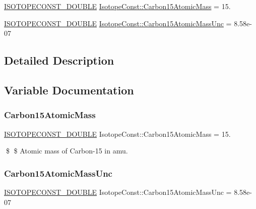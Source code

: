 \begin{DoxyCompactItemize}
\item 
\mbox{\hyperlink{group___isotope_const-_macros_ga8f45a7272ce02c0b4c65c44636ed719a}{I\+S\+O\+T\+O\+P\+E\+C\+O\+N\+S\+T\+\_\+\+D\+O\+U\+B\+LE}} \mbox{\hyperlink{group___isotope_const-_carbon-_c15_ga125cc61122384ad06638cca660519e6d}{Isotope\+Const\+::\+Carbon15\+Atomic\+Mass}} = 15.
\item 
\mbox{\hyperlink{group___isotope_const-_macros_ga8f45a7272ce02c0b4c65c44636ed719a}{I\+S\+O\+T\+O\+P\+E\+C\+O\+N\+S\+T\+\_\+\+D\+O\+U\+B\+LE}} \mbox{\hyperlink{group___isotope_const-_carbon-_c15_gaf3f3a7992c89c1f3d3882d9b927b8e33}{Isotope\+Const\+::\+Carbon15\+Atomic\+Mass\+Unc}} = 8.\+58e-\/07
\end{DoxyCompactItemize}


\subsection{Detailed Description}


\subsection{Variable Documentation}
\mbox{\label{group___isotope_const-_carbon-_c15_ga125cc61122384ad06638cca660519e6d}} 
\subsubsection{\texorpdfstring{Carbon15\+Atomic\+Mass}{Carbon15AtomicMass}}
{\footnotesize\ttfamily \mbox{\hyperlink{group___isotope_const-_macros_ga8f45a7272ce02c0b4c65c44636ed719a}{I\+S\+O\+T\+O\+P\+E\+C\+O\+N\+S\+T\+\_\+\+D\+O\+U\+B\+LE}} Isotope\+Const\+::\+Carbon15\+Atomic\+Mass = 15.}

\$ \$ Atomic mass of Carbon-\/15 in amu. \mbox{\label{group___isotope_const-_carbon-_c15_gaf3f3a7992c89c1f3d3882d9b927b8e33}} 
\subsubsection{\texorpdfstring{Carbon15\+Atomic\+Mass\+Unc}{Carbon15AtomicMassUnc}}
{\footnotesize\ttfamily \mbox{\hyperlink{group___isotope_const-_macros_ga8f45a7272ce02c0b4c65c44636ed719a}{I\+S\+O\+T\+O\+P\+E\+C\+O\+N\+S\+T\+\_\+\+D\+O\+U\+B\+LE}} Isotope\+Const\+::\+Carbon15\+Atomic\+Mass\+Unc = 8.\+58e-\/07}

